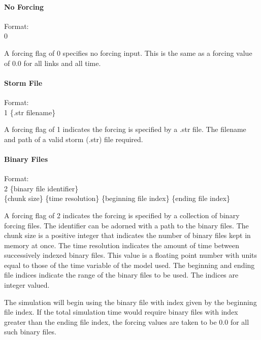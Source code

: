 \documentclass[12pt]{article}
\newenvironment{codeindent}
{\begin{list}{}
        {\setlength{\leftmargin}{.1in}}
        \item[]
}
{\end{list}}
\begin{document}
\paragraph{No Forcing} \label{sec: no forcing}

\begin{codeindent}
Format: \\
 0
\end{codeindent}

A forcing flag of 0 specifies no forcing input. This is the same as a forcing value of 0.0 for all links and all time.

\paragraph{Storm File} \label{sec: storm file}

\begin{codeindent}
 Format: \\
 1 \{.str filename\}
\end{codeindent}

A forcing flag of 1 indicates the forcing is specified by a .str file. The filename and path of a valid storm (.str) file required.

\paragraph{Binary Files} \label{sec: binary files}

\begin{codeindent}
 Format: \\
 2 \{binary file identifier\} \\
 \{chunk size\} \{time resolution\} \{beginning file index\} \{ending file index\}
\end{codeindent}
 
 A forcing flag of 2 indicates the forcing is specified by a collection of binary forcing files. The identifier can be adorned with a path to the binary files. The chunk size is a positive integer that indicates the number of binary files kept in memory at once. The time resolution indicates the amount of time between successively indexed binary files. This value is a floating point number with units equal to those of the time variable of the model used. The beginning and ending file indices indicate the range of the binary files to be used. The indices are integer valued.
 
 The simulation will begin using the binary file with index given by the beginning file index. If the total simulation time would require binary files with index greater than the ending file index, the forcing values are taken to be 0.0 for all such binary files.
 
\end{document}
